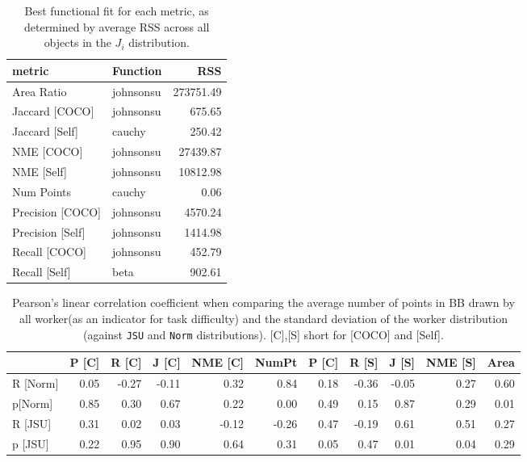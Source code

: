 \documentclass[12pt]{article}
\begin{document}
\begin{appendices}
\begin{table}[ht]
\centering
\begin{tabular}{llr}
\hline
 metric           & Function   &       RSS \\
\hline
 Area Ratio       & johnsonsu  & 273751.49 \\
 Jaccard [COCO]   & johnsonsu  &    675.65 \\
 Jaccard [Self]   & cauchy     &    250.42 \\
 NME [COCO]       & johnsonsu  &  27439.87 \\
 NME [Self]       & johnsonsu  &  10812.98 \\
 Num Points       & cauchy     &      0.06 \\
 Precision [COCO] & johnsonsu  &   4570.24 \\
 Precision [Self] & johnsonsu  &   1414.98 \\
 Recall [COCO]    & johnsonsu  &    452.79 \\
 Recall [Self]    & beta       &    902.61 \\
\hline
\end{tabular}
\caption{Best functional fit for each metric, as determined by average RSS across all objects in the $J_i$ distribution.}
\label{all_Ji_fit}
\end{table}
\begin{table}[ht]
\centering
\begin{tabular}{lrrrrrrrrrr}
\hline
          &   P [C] &   R [C] &   J [C] &   NME [C] &   NumPt &   P [C] &   R [S] &   J [S] &   NME [S] &   Area \\
\hline
 R [Norm] &    0.05 &   -0.27 &   -0.11 &      0.32 &    0.84 &    0.18 &   -0.36 &   -0.05 &      0.27 &   0.60 \\
 p[Norm]  &    0.85 &    0.30 &    0.67 &      0.22 &    0.00 &    0.49 &    0.15 &    0.87 &      0.29 &   0.01 \\
 R [JSU]  &    0.31 &    0.02 &    0.03 &     -0.12 &   -0.26 &    0.47 &   -0.19 &    0.61 &      0.51 &   0.27 \\
 p [JSU]  &    0.22 &    0.95 &    0.90 &      0.64 &    0.31 &    0.05 &    0.47 &    0.01 &      0.04 &   0.29 \\
\hline
\end{tabular}
\caption{Pearson's linear correlation coefficient when comparing the average number of points in BB drawn by all worker(as an indicator for task difficulty) and the standard deviation of the worker distribution (against \texttt{JSU} and \texttt{Norm} distributions). [C],[S] short for [COCO] and [Self].}
\label{assum3}
\end{table}


\end{appendices}
\end{document}
